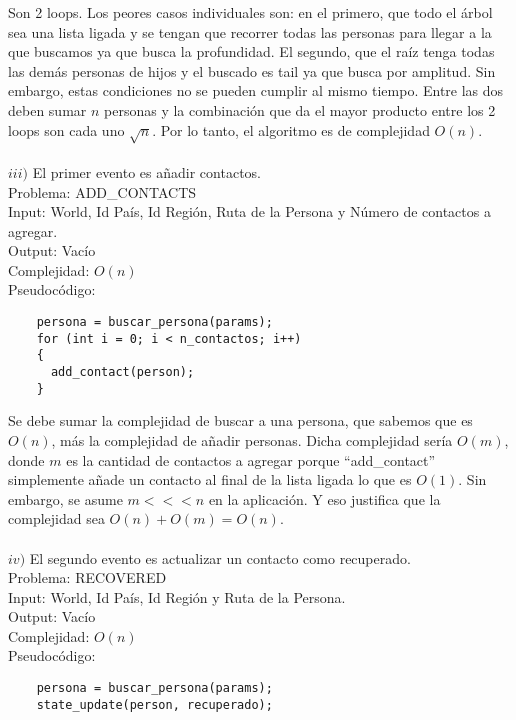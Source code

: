 \documentclass[letter]{article}
\begin{document}
\begin{parte}{1}
    Son 2 loops. Los peores casos individuales son: en el primero, que todo el árbol sea una lista ligada y se tengan que recorrer todas las personas para llegar a la que buscamos ya que busca la profundidad. El segundo, que el raíz tenga todas las demás personas de hijos y el buscado es tail ya que busca por amplitud. Sin embargo, estas condiciones no se pueden cumplir al mismo tiempo. Entre las dos deben sumar $n$ personas y la combinación que da el mayor producto entre los 2 loops son cada uno $\sqrt{n}$. Por lo tanto, el algoritmo es de complejidad $O(n)$.\\\\
	 
	\noindent
	$iii)$ El primer evento es añadir contactos.\\
	
	\noindent
	Problema: ADD\_CONTACTS\\
	Input: World, Id País, Id Región, Ruta de la Persona y Número de contactos a agregar.\\
	Output: Vacío\\
	Complejidad: $O(n)$\\
	Pseudocódigo:
	
	\begin{lstlisting}
	persona = buscar_persona(params);
	for (int i = 0; i < n_contactos; i++)
	{
 	  add_contact(person);
	}
	\end{lstlisting}
	\vspace{0.2cm}
	
	Se debe sumar la complejidad de buscar a una persona, que sabemos que es $O(n)$, más la complejidad de añadir personas. Dicha complejidad sería $O(m)$, donde $m$ es la cantidad de contactos a agregar porque ``add\_contact'' simplemente añade un contacto al final de la lista ligada lo que es $O(1)$. Sin embargo, se asume $m <<< n$ en la aplicación. Y eso justifica que la complejidad sea $O(n) + O(m) = O(n)$.\\\\
	
	\noindent
	$iv)$ El segundo evento es actualizar un contacto como recuperado.\\
	
	\noindent
	Problema: RECOVERED\\
	Input: World, Id País, Id Región y Ruta de la Persona.\\
	Output: Vacío\\
	Complejidad: $O(n)$\\
	Pseudocódigo:
	
	\begin{lstlisting}
	persona = buscar_persona(params);
	state_update(person, recuperado);
	\end{lstlisting}
	\vspace{0.2cm}
	

\end{parte}
\end{document}
